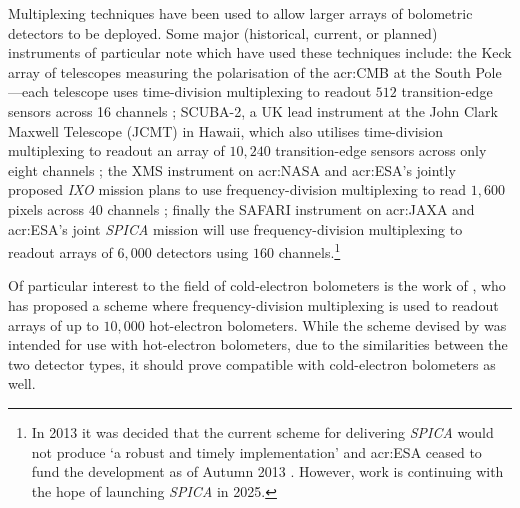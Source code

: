 \par 
Multiplexing techniques have been used to allow larger arrays of bolometric detectors to be deployed. Some major (historical, current, or planned) instruments of particular note which have used these techniques include: the Keck array of telescopes measuring the polarisation of the \gls{acr:CMB} at the South Pole---each telescope uses time-division multiplexing to readout $512$ transition-edge sensors across 16 channels \parencite{Orlando2010}; SCUBA-2, a UK lead instrument at the John Clark Maxwell Telescope (JCMT) in Hawaii, which also utilises time-division multiplexing to readout an array of $10,240$ transition-edge sensors  across only eight channels \parencite{Holland2013}; the XMS instrument on \gls{acr:NASA} and \gls{acr:ESA}'s jointly proposed \textit{IXO} mission plans to use frequency-division multiplexing to read $1,600$ pixels across $40$ channels \parencite{denHartog2011}; finally the SAFARI instrument on \gls{acr:JAXA} and \gls{acr:ESA}'s joint \textit{SPICA} mission will use frequency-division multiplexing to readout arrays of $6,000$ detectors using $160$ channels.\footnote{In 2013 it was decided that the current scheme for delivering \textit{SPICA} would not produce `a robust and timely implementation' and \gls{acr:ESA} ceased to fund the development as of Autumn 2013 \parencite{ESA2014}. However, work is continuing \parencite{SRON2014} with the hope of launching \textit{SPICA} in 2025.}
\par 
Of particular interest to the field of cold-electron bolometers is the work of \textcite{Schmidt2005}, who has proposed a scheme where frequency-division multiplexing is used to readout arrays of up to $10,000$ hot-electron bolometers. While the scheme devised by \citeauthor{Schmidt2005} was intended for use with hot-electron bolometers, due to the similarities between the two detector types, it should prove compatible with cold-electron bolometers as well.
%
